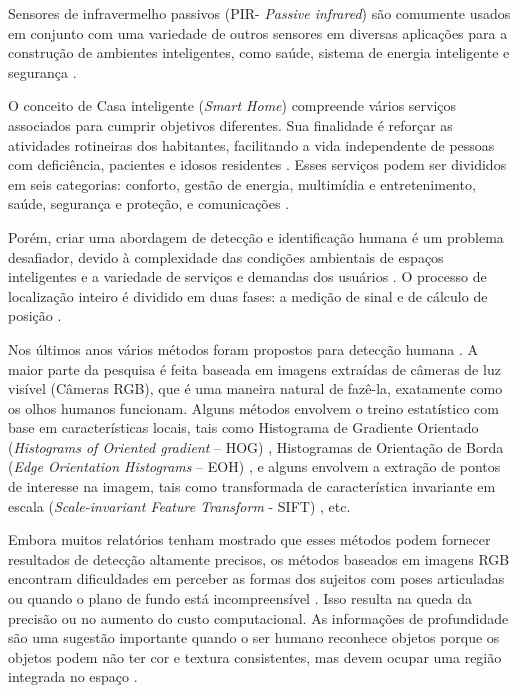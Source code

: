 Sensores de infravermelho passivos (PIR- \textit{Passive infrared}) são comumente usados em conjunto com uma variedade de outros sensores em diversas aplicações para a construção de ambientes inteligentes, como saúde, sistema de energia inteligente e segurança \cite{yun2014human}.

O conceito de Casa inteligente (\textit{Smart Home}) compreende vários serviços associados para cumprir objetivos diferentes. Sua finalidade é reforçar as atividades rotineiras dos habitantes, facilitando a vida independente de pessoas com deficiência, pacientes e idosos residentes \cite{al2014advanced}. Esses serviços podem ser divididos em seis categorias: conforto, gestão de energia, multimídia e entretenimento, saúde, segurança e proteção, e comunicações \cite{dewsbury2001process}.

Porém, criar uma abordagem de detecção e identificação humana é um problema desafiador, devido à complexidade das condições ambientais de espaços inteligentes e a variedade de serviços e demandas dos usuários \cite{al2014advanced}. O processo de localização inteiro é dividido em duas fases: a medição de sinal e de cálculo de posição \cite{zhang2010localization}. 

Nos últimos anos vários métodos foram propostos para detecção humana \cite{dalal2005,dalal2006,ikemura2011,schwartz2009}. A maior parte da pesquisa é feita baseada em imagens extraídas de câmeras de luz visível (Câmeras RGB), que é uma maneira natural de fazê-la, exatamente como os olhos humanos funcionam. Alguns métodos envolvem o treino estatístico com base em características locais, tais como Histograma de Gradiente Orientado (\textit{Histograms of Oriented gradient} – HOG) \cite{dalal2005}, Histogramas de Orientação de Borda (\textit{Edge Orientation Histograms} – EOH) \cite{levi2004}, e alguns envolvem a extração de pontos de interesse na imagem, tais como transformada de característica invariante em escala (\textit{Scale-invariant Feature Transform} - SIFT) \cite{lowe1999}, etc.

Embora muitos relatórios tenham mostrado que esses métodos podem fornecer resultados de detecção altamente precisos, os métodos baseados em imagens RGB encontram dificuldades em perceber as formas dos sujeitos com poses articuladas ou quando o plano de fundo está incompreensível \cite{xia2011human}. Isso resulta na queda da precisão ou no aumento do custo computacional. As informações de profundidade são uma sugestão importante quando o ser humano reconhece objetos porque os objetos podem não ter cor e textura consistentes, mas devem ocupar uma região integrada no espaço \cite{xia2011human}. 

